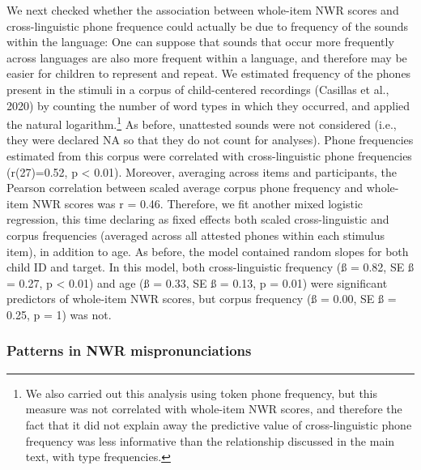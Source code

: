 \documentclass[english,,man,floatsintext]{apa6}
\begin{document}
We next checked whether the association between whole-item NWR scores
and cross-linguistic phone frequence could actually be due to frequency
of the sounds within the language: One can suppose that sounds that
occur more frequently across languages are also more frequent within a
language, and therefore may be easier for children to represent and
repeat. We estimated frequency of the phones present in the stimuli in a
corpus of child-centered recordings (Casillas et al., 2020) by counting
the number of word types in which they occurred, and applied the natural
logarithm.\footnote{We also carried out this analysis using token phone
  frequency, but this measure was not correlated with whole-item NWR
  scores, and therefore the fact that it did not explain away the
  predictive value of cross-linguistic phone frequency was less
  informative than the relationship discussed in the main text, with
  type frequencies.} As before, unattested sounds were not considered
(i.e., they were declared NA so that they do not count for analyses).
Phone frequencies estimated from this corpus were correlated with
cross-linguistic phone frequencies (r(27)=0.52, p \textless{} 0.01).
Moreover, averaging across items and participants, the Pearson
correlation between scaled average corpus phone frequency and whole-item
NWR scores was r = 0.46. Therefore, we fit another mixed logistic
regression, this time declaring as fixed effects both scaled
cross-linguistic and corpus frequencies (averaged across all attested
phones within each stimulus item), in addition to age. As before, the
model contained random slopes for both child ID and target. In this
model, both cross-linguistic frequency (ß = 0.82, SE ß = 0.27, p
\textless{} 0.01) and age (ß = 0.33, SE ß = 0.13, p = 0.01) were
significant predictors of whole-item NWR scores, but corpus frequency (ß
= 0.00, SE ß = 0.25, p = 1) was not.

\subsubsection{Patterns in NWR
mispronunciations}\label{patterns-in-nwr-mispronunciations}
\end{document}
